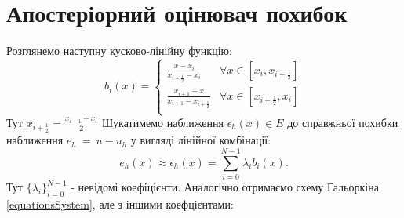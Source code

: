 \documentclass[a4paper]{article}
\numberwithin{equation}{section}
\begin{document}
\section{Апостеріорний оцінювач похибок}
Розглянемо наступну кусково-лінійну функцію:
\begin{equation}\label{bubbleFunctions}
b_i(x)=\begin{cases}
\frac{ x - x_i } { x_{i + \frac{1}{2} } - x_i } & \forall x \in [x_i, x_{i + \frac{1}{2}}] \\
\frac{ x_{i + 1} - x} { x_{ i + 1 } - x_{ i + \frac{1}{2} } } & \forall x \in [ x_{ i + \frac{1}{2} }, x_i] \\
\end{cases}
\end{equation}
Тут $x_{ i + \frac{1}{2} } = \frac{x_{ i + 1 } + x_i}{2}$ Шукатимемо наближення $\epsilon_h(x) \in E$ до справжньої похибки наближення $e_h~=~u-u_h$ у вигляді лінійної комбінації:
\begin{equation}
e_h(x)\approx\epsilon_h(x)=\sum_{i=0}^{N-1}\lambda_ib_i(x).
\end{equation}
Тут $\{\lambda_i\}_{i=0}^{N-1}$ - невідомі коефіцієнти. Аналогічно отримаємо схему Гальоркіна \ref{equationsSystem}, але з іншими коефцієнтами:
\end{document}
